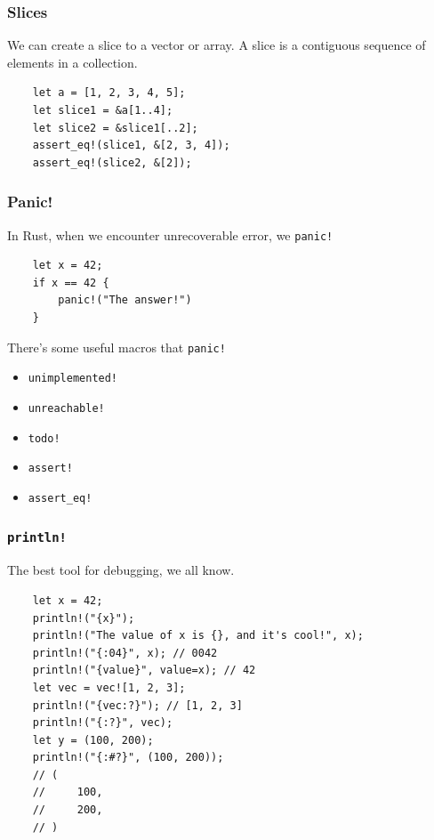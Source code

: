 \documentclass[aspectratio=1610,t]{beamer}
\begin{document}

\begin{frame}[fragile]
\frametitle{Slices}
We can create a slice to a vector or array. A slice is a contiguous sequence of elements in a collection.

\begin{verbatim}
    let a = [1, 2, 3, 4, 5];
    let slice1 = &a[1..4];
    let slice2 = &slice1[..2];
    assert_eq!(slice1, &[2, 3, 4]);
    assert_eq!(slice2, &[2]);
\end{verbatim}
\end{frame}


\begin{frame}[fragile]
\frametitle{Panic!}
In Rust, when we encounter unrecoverable error, we \texttt{panic!}

\begin{verbatim}
    let x = 42;
    if x == 42 {
        panic!("The answer!")
    }
\end{verbatim}

There's some useful macros that \texttt{panic!}

\begin{itemize}
    \item \texttt{unimplemented!}
    \item \texttt{unreachable!}
    \item \texttt{todo!}
    \item \texttt{assert!}
    \item \texttt{assert\_eq!}
\end{itemize}
\end{frame}


\begin{frame}[fragile]
\frametitle{\texttt{println!}}
The best tool for debugging, we all know. 

\begin{verbatim}
    let x = 42;
    println!("{x}");
    println!("The value of x is {}, and it's cool!", x);
    println!("{:04}", x); // 0042
    println!("{value}", value=x); // 42
    let vec = vec![1, 2, 3];
    println!("{vec:?}"); // [1, 2, 3]
    println!("{:?}", vec);
    let y = (100, 200);
    println!("{:#?}", (100, 200));
    // (
    //     100,
    //     200,
    // )
\end{verbatim}
\end{frame}
\end{document}
